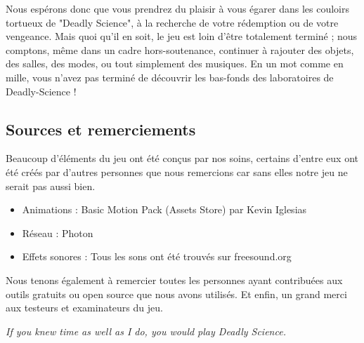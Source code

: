 \documentclass{article}
\begin{document}
Nous espérons donc que vous prendrez du plaisir à vous égarer dans les couloirs tortueux de "Deadly Science", à la recherche de votre rédemption ou de votre vengeance. Mais quoi qu'il en soit, le jeu est loin d'être totalement terminé ; nous comptons, même dans un cadre hors-soutenance, continuer à rajouter des objets, des salles, des modes, ou tout simplement des musiques. En un mot comme en mille, vous n'avez pas terminé de découvrir les bas-fonds des laboratoires de Deadly-Science !

\subsection{Sources et remerciements}

Beaucoup d'éléments du jeu ont été conçus par nos soins, certains d'entre eux ont été créés par d'autres personnes que nous remercions car sans elles notre jeu ne serait pas aussi bien.

\begin{itemize}
    \item Animations : Basic Motion Pack (Assets Store) par Kevin Iglesias
    \item Réseau : Photon
    \item Effets sonores : Tous les sons ont été trouvés sur freesound.org
\end{itemize}
    
Nous tenons également à remercier toutes les personnes ayant contribuées aux outils gratuits ou open source que nous avons utilisés.
Et enfin, un grand merci aux testeurs et examinateurs du jeu.


\newpage
\begin{center}
\emph{If you knew time as well as I do, you would play Deadly Science.}
\end{center}
\end{document}
